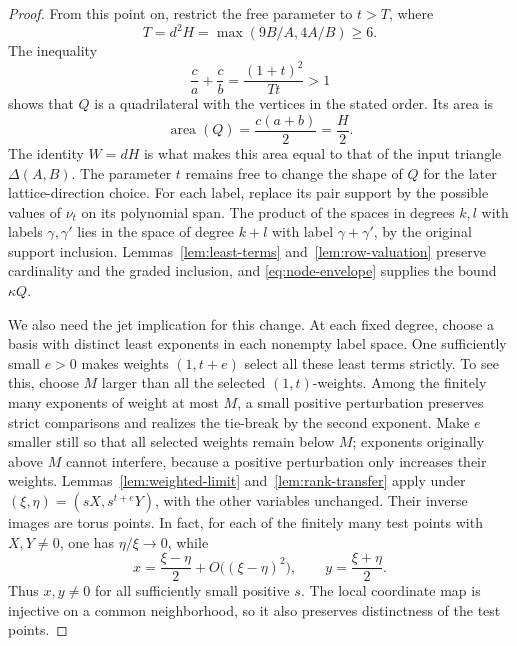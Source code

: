\begin{proof}
From this point on, restrict the free parameter to $t>T$, where
\begin{equation}\label{eq:node-parameters}
 T=d^2H=\max(9B/A,4A/B)\ge6.
\end{equation}
The inequality
\[
 \frac ca+\frac cb=\frac{(1+t)^2}{Tt}>1
\]
shows that $Q$ is a quadrilateral with the vertices in the stated order.
Its area is
\begin{equation}\label{eq:node-area}
 \operatorname{area}(Q)=\frac{c(a+b)}2=\frac H2.
\end{equation}
The identity $W=dH$ is what makes this area equal to that of the input
triangle $\Delta(A,B)$.  The parameter $t$ remains free to change the
shape of $Q$ for the later lattice-direction choice.
For each label, replace its pair support by the possible values of
$\nu_t$ on its polynomial span.  The product of the spaces in degrees
$k,l$ with labels $\gamma,\gamma'$ lies in the space of degree $k+l$
with label $\gamma+\gamma'$, by the original support inclusion.
Lemmas~\ref{lem:least-terms}
and~\ref{lem:row-valuation} preserve cardinality and the graded inclusion,
and \eqref{eq:node-envelope} supplies the bound $\kappa Q$.

We also need the jet implication for this change.  At each fixed degree,
choose a basis with distinct least exponents in each nonempty label space.
One sufficiently small $e>0$ makes weights $(1,t+e)$ select all these
least terms strictly.  To see this, choose $M$ larger than all the selected
$(1,t)$-weights.  Among the finitely many exponents of weight at most $M$,
a small positive perturbation preserves strict comparisons and realizes
the tie-break by the second exponent.  Make $e$ smaller still so that all
selected weights remain below $M$; exponents originally above $M$ cannot
interfere, because a positive perturbation only increases their weights.
Lemmas~\ref{lem:weighted-limit}
and~\ref{lem:rank-transfer} apply under
$(\xi,\eta)=(sX,s^{t+e}Y)$, with the other variables unchanged.
Their inverse images are torus points.  In fact, for each of the finitely
many test points with $X,Y\ne0$, one has $\eta/\xi\to0$, while
\[
 x=\frac{\xi-\eta}{2}+O\bigl((\xi-\eta)^2\bigr),
 \qquad y=\frac{\xi+\eta}{2}.
\]
Thus $x,y\ne0$ for all sufficiently small positive $s$.  The local
coordinate map is injective on a common neighborhood, so it also preserves
distinctness of the test points.


\end{proof}
